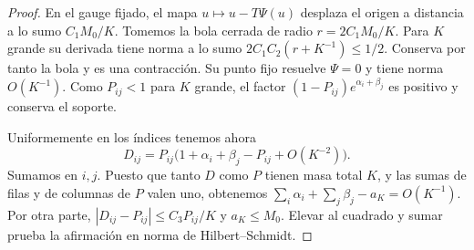\begin{proof}
En el gauge fijado, el mapa $u\mapsto u-T\Psi(u)$ desplaza el origen a distancia a lo sumo
$C_1M_0/K$. Tomemos la bola cerrada de radio $r=2C_1M_0/K$. Para $K$ grande su derivada tiene norma a
lo sumo $2C_1C_2(r+K^{-1})\le1/2$. Conserva por tanto la bola y es una contracción. Su punto fijo
resuelve $\Psi=0$ y tiene norma $O(K^{-1})$. Como $P_{ij}<1$ para $K$ grande, el factor
$(1-P_{ij})e^{\alpha_i+\beta_j}$ es positivo y conserva el soporte.

Uniformemente en los índices tenemos ahora
\[
 D_{ij}=P_{ij}\bigl(1+\alpha_i+\beta_j-P_{ij}+O(K^{-2})\bigr).
\]
Sumamos en $i,j$. Puesto que tanto $D$ como $P$ tienen masa total $K$, y las sumas de filas y de
columnas de $P$ valen uno,
obtenemos $\sum_i\alpha_i+\sum_j\beta_j-a_K=O(K^{-1})$. Por otra parte, $|D_{ij}-P_{ij}|\le
C_3P_{ij}/K$ y $a_K\le M_0$. Elevar al cuadrado y sumar prueba la afirmación en norma de
Hilbert--Schmidt.
\end{proof}
